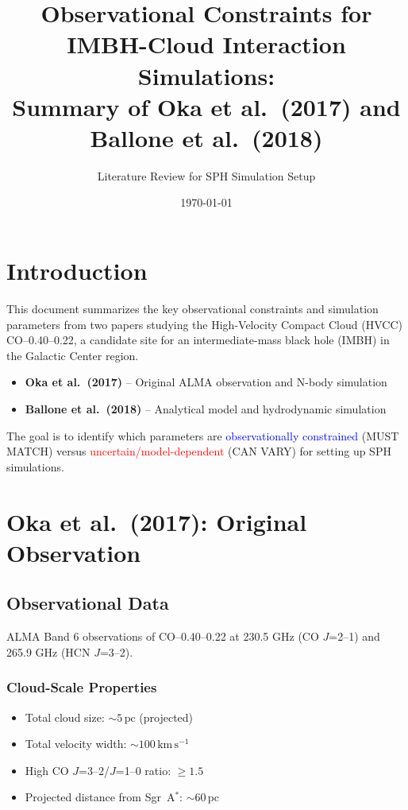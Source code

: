 \documentclass[11pt,a4paper]{article}
\title{Observational Constraints for IMBH-Cloud Interaction Simulations:\\
Summary of Oka et al.~(2017) and Ballone et al.~(2018)}
\author{Literature Review for SPH Simulation Setup}
\date{\today}
\newcommand{\kms}{\,\mathrm{km\,s^{-1}}}
\newcommand{\pc}{\,\mathrm{pc}}
\begin{document}
\maketitle

\tableofcontents
\newpage

\section{Introduction}

This document summarizes the key observational constraints and simulation parameters from two papers studying the High-Velocity Compact Cloud (HVCC) CO--0.40--0.22, a candidate site for an intermediate-mass black hole (IMBH) in the Galactic Center region.

\begin{itemize}
    \item \textbf{Oka et al.~(2017)} -- Original ALMA observation and N-body simulation
    \item \textbf{Ballone et al.~(2018)} -- Analytical model and hydrodynamic simulation
\end{itemize}

The goal is to identify which parameters are \textcolor{blue}{observationally constrained} (MUST MATCH) versus \textcolor{red}{uncertain/model-dependent} (CAN VARY) for setting up SPH simulations.

\section{Oka et al.~(2017): Original Observation}

\subsection{Observational Data}

ALMA Band 6 observations of CO--0.40--0.22 at 230.5 GHz (CO $J$=2--1) and 265.9 GHz (HCN $J$=3--2).

\subsubsection{Cloud-Scale Properties}
\begin{itemize}
    \item Total cloud size: $\sim 5\pc$ (projected)
    \item Total velocity width: $\sim 100\kms$
    \item High CO $J$=3--2/$J$=1--0 ratio: $\geq 1.5$
    \item Projected distance from Sgr~A$^*$: $\sim 60\pc$
\end{itemize}
\end{document}
